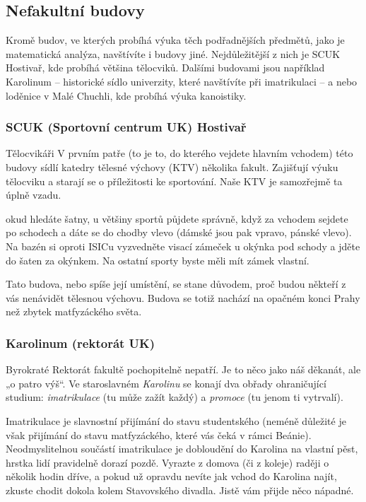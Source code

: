 \subsection{Nefakultní budovy}
Kromě budov, ve kterých probíhá výuka těch podřadnějších předmětů, jako je
matematická analýza, navštívíte i budovy jiné. Nejdůležitější z nich je SCUK
Hostivař, kde probíhá většina tělocviků. Dalšími budovami jsou například
Karolinum – historické sídlo univerzity, které navštívíte při imatrikulaci – a
nebo loděnice v Malé Chuchli, kde probíhá výuka kanoistiky.


\subsubsection{SCUK (Sportovní centrum UK) Hostivař}
{Tělocvikáři}
V prvním patře (to je to, do kterého vejdete hlavním vchodem) této budovy sídlí
katedry tělesné výchovy (KTV) několika fakult. Zajišťují výuku tělocviku a
starají se o příležitosti ke sportování. Naše KTV je samozřejmě ta úplně vzadu.

okud hledáte šatny, u většiny sportů půjdete správně, když za vchodem sejdete
po schodech a dáte se do chodby vlevo (dámské jsou pak vpravo, pánské vlevo). Na
bazén si oproti ISICu vyzvedněte visací zámeček u okýnka pod schody a jděte do
šaten za okýnkem. Na ostatní sporty byste měli mít zámek vlastní.

Tato budova, nebo spíše její umístění, se stane důvodem, proč budou někteří z
vás nenávidět tělesnou výchovu. Budova se totiž nachází na opačném konci Prahy
než zbytek matfyzáckého světa.


\subsubsection{Karolinum (rektorát UK)}
{Byrokraté}
Rektorát fakultě pochopitelně nepatří. Je to něco jako náš děkanát, ale „o patro
výš“. Ve staroslavném \textit{Karolinu} se konají dva obřady ohraničující
studium: \textit{imatrikulace} (tu může zažít každý) a \textit{promoce} (tu
jenom ti vytrvalí).

Imatrikulace je slavnostní přijímání do stavu studentského (neméně důležité je
však přijímání do stavu matfyzáckého, které vás čeká v rámci Beánie).
Neodmyslitelnou součástí imatrikulace je dobloudění do Karolina na vlastní pěst,
hrstka lidí pravidelně dorazí pozdě. Vyrazte z domova (či z koleje) raději o
několik hodin dříve, a pokud už opravdu nevíte jak vchod do Karolina najít,
zkuste chodit dokola kolem Stavovského divadla. Jistě vám přijde něco nápadné.


